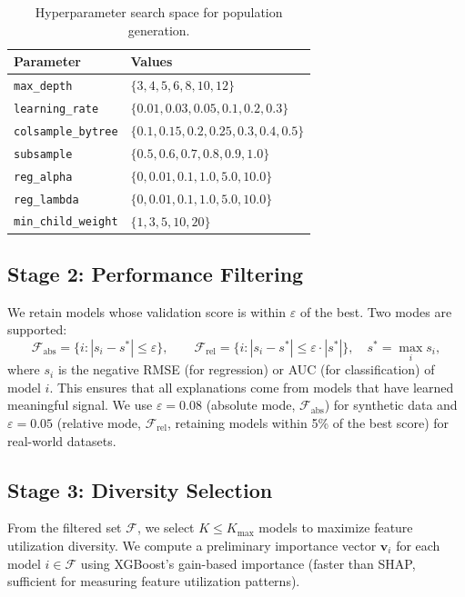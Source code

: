 \documentclass[11pt]{article}
\begin{document}
\begin{table}[htbp]
\centering
\caption{Hyperparameter search space for population generation.}
\label{tab:search_space}
\begin{tabular}{ll}
\toprule
\textbf{Parameter} & \textbf{Values} \\
\midrule
\texttt{max\_depth}         & $\{3, 4, 5, 6, 8, 10, 12\}$ \\
\texttt{learning\_rate}     & $\{0.01, 0.03, 0.05, 0.1, 0.2, 0.3\}$ \\
\texttt{colsample\_bytree}  & $\{0.1, 0.15, 0.2, 0.25, 0.3, 0.4, 0.5\}$ \\
\texttt{subsample}          & $\{0.5, 0.6, 0.7, 0.8, 0.9, 1.0\}$ \\
\texttt{reg\_alpha}         & $\{0, 0.01, 0.1, 1.0, 5.0, 10.0\}$ \\
\texttt{reg\_lambda}        & $\{0, 0.01, 0.1, 1.0, 5.0, 10.0\}$ \\
\texttt{min\_child\_weight} & $\{1, 3, 5, 10, 20\}$ \\
\bottomrule
\end{tabular}
\end{table}

\subsection{Stage 2: Performance Filtering}

We retain models whose validation score is within $\varepsilon$ of the
best. Two modes are supported:
\begin{equation}
  \mathcal{F}_{\text{abs}} = \{i : |s_i - s^*| \leq \varepsilon\},
  \qquad
  \mathcal{F}_{\text{rel}} = \{i : |s_i - s^*| \leq \varepsilon \cdot |s^*|\},
  \quad s^* = \max_i s_i,
  \label{eq:filter}
\end{equation}
where $s_i$ is the negative RMSE (for regression) or AUC (for
classification) of model $i$. This ensures that all explanations come from
models that have learned meaningful signal. We use $\varepsilon = 0.08$
(absolute mode, $\mathcal{F}_{\text{abs}}$) for synthetic data and
$\varepsilon = 0.05$ (relative mode, $\mathcal{F}_{\text{rel}}$,
retaining models within 5\% of the best score) for real-world datasets.

\subsection{Stage 3: Diversity Selection}

From the filtered set $\mathcal{F}$, we select $K \leq K_{\max}$
models to maximize feature utilization diversity. We compute a
preliminary importance vector $\mathbf{v}_i$ for each model $i \in
\mathcal{F}$ using XGBoost's gain-based importance (faster than SHAP,
sufficient for measuring feature utilization patterns).
\end{document}
